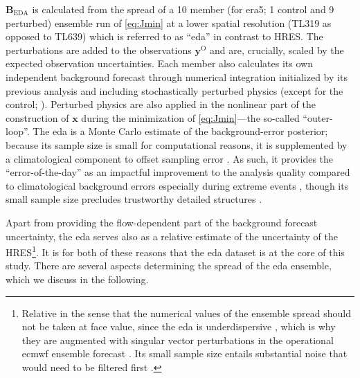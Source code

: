 $\mathbf{B}_{\text{EDA}}$ is calculated from the spread of a 10 member (for \gls{era5}; 1 control and 9 perturbed) ensemble run of \cref{eq:Jmin} at a lower spatial resolution (TL319 as opposed to TL639) which is referred to as \enquote{\gls{eda}} in contrast to HRES. The perturbations are added to the observations $\mathbf{y}^{\mathrm{O}}$ and are, crucially, scaled by the expected observation uncertainties. Each member also calculates its own independent background forecast through numerical integration initialized by its previous analysis and including stochastically perturbed physics (except for the control; \cite{ecmwfIFSDocumentationCY41R22016a, leutbecherStochasticRepresentationsModel2017}). Perturbed physics are also applied in the nonlinear part of the construction of $\mathbf{x}$ during the minimization of \cref{eq:Jmin}---the so-called \enquote{outer-loop}. The \gls{eda} is a Monte Carlo estimate of the background-error posterior; because its sample size is small for computational reasons, it is supplemented by a climatological component to offset sampling error \parencite{bonavitaEstimatingBackgrounderrorVariances2011, bonavitaEvolutionECMWFHybrid2016, bannisterReviewOperationalMethods2017}. As such, it provides the \enquote{error-of-the-day} as an impactful improvement to the analysis quality  compared to climatological background errors especially during extreme events \parencite{bonavitaUseEDABackground2012}, though its small sample size precludes trustworthy detailed structures \parencite{isaksenEnsembleDataAssimilations2010, bonavitaEstimatingBackgrounderrorVariances2011}.

Apart from providing the flow-dependent part of the background forecast uncertainty, the \gls{eda} serves also as a relative estimate of the uncertainty of the HRES\footnote{Relative in the sense that the numerical values of the ensemble spread should not be taken at face value, since the \gls{eda} is underdispersive \parencite{buizzaPotentialUseEnsemble2008, sociERA5GlobalReanalysis2024}, which is why they are augmented with singular vector perturbations in the operational \gls{ecmwf} ensemble forecast \parencite{leutbecherEnsembleForecasting2008, palmerECMWFEnsemblePrediction2019, langMoreAccuracyLess2021}. Its small sample size entails substantial noise that would need to be filtered first \parencite{raynaudObjectiveFilteringEnsemblebased2009, bonavitaEstimatingBackgrounderrorVariances2011}.}. It is for both of these reasons that the \gls{eda} dataset is at the core of this study. There are several aspects determining the spread of the \gls{eda} ensemble, which we discuss in the following.

